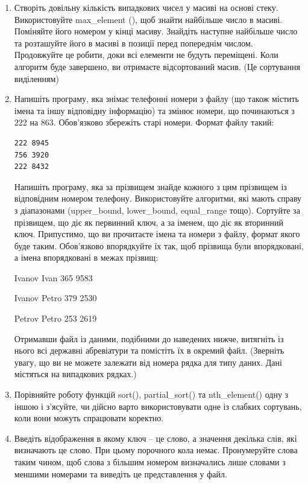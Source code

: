 \documentclass[a5paper,titlepage,openany,twoside,
]
{book_unv}%
\begin{document}
\begin{enumerate}
\item
  Створіть довільну кількість випадкових чисел у масиві на основі стеку.
  Використовуйте max\_element (), щоб знайти найбільше число в масиві.
  Поміняйте його номером у кінці масиву. Знайдіть наступне найбільше
  число та розташуйте його в масиві в позиції перед попереднім числом.
  Продовжуйте це робити, доки всі елементи не будуть переміщені. Коли
  алгоритм буде завершено, ви отримаєте відсортований масив. (Це
  сортування виділенням)
\item
  Напишіть програму, яка знімає телефонні номери з файлу (що також
  містить імена та іншу відповідну інформацію) та змінює номери, що
  починаються з 222 на 863. Обов'язково збережіть старі номери. Формат
  файлу такий:
\begin{verbatim}
222 8945
756 3920
222 8432
\end{verbatim}

Напишіть програму, яка за прізвищем знайде кожного з цим прізвищем із
відповідним номером телефону. Використовуйте алгоритми, які мають справу
з діапазонами (upper\_bound, lower\_bound, equal\_range тощо). Сортуйте
за прізвищем, що діє як первинний ключ, а за іменем, що діє як вторинний
ключ. Припустимо, що ви прочитаєте імена та номери з файлу, формат якого
буде таким. Обов'язково впорядкуйте їх так, щоб прізвища були
впорядковані, а імена впорядковані в межах прізвищ:

Ivanov Ivan 365 9583

Ivanov Petro 379 2530

Petrov Petro 253 2619

Отримавши файл із даними, подібними до наведених нижче, витягніть із
нього всі державні абревіатури та помістіть їх в окремий файл. (Зверніть
увагу, що ви не можете залежати від номера рядка для типу даних. Дані
містяться на випадкових рядках.)

\item
  Порівняйте роботу функцій sort(), partial\_sort() та nth\_element()
  одну з іншою і з'ясуйте, чи дійсно варто використовувати одне із
  слабких сортувань, коли вони можуть спрацювати коректно.

\item
  Введіть відображення в якому ключ -- це слово, а значення декілька
  слів, які визначають це слово. При цьому порочного кола немає.
  Пронумеруйте слова таким чином, щоб слова з більшим номером
  визначались лише словами з меншими номерами та виведіть це представлення
у файл.
\end{enumerate}
\end{document}
